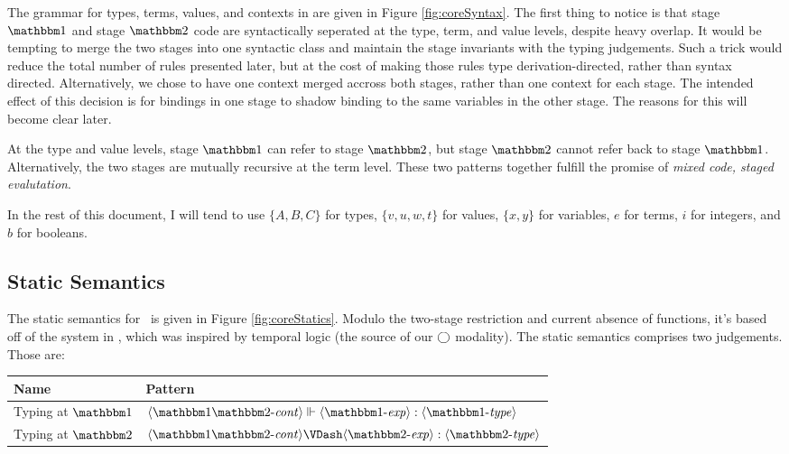 \documentclass{article}
\begin{document}
The grammar for types, terms, values, and contexts in \ellStaged are given in Figure \ref{fig:coreSyntax}.  The first thing to notice is that stage $\bbone$ and stage $\bbtwo$ code are syntactically seperated at the type, term, and value levels, despite heavy overlap.  It would be tempting to merge the two stages into one syntactic class and maintain the stage invariants with the typing judgements.  Such a trick would reduce the total number of rules presented later, but at the cost of making those rules type derivation-directed, rather than syntax directed.  Alternatively, we chose to have one context merged accross both stages, rather than one context for each stage.  The intended effect of this decision is for bindings in one stage to shadow binding to the same variables in the other stage.  The reasons for this will become clear later.

At the type and value levels, stage $\bbone$ can refer to stage $\bbtwo$, but stage $\bbtwo$ cannot refer back to stage $\bbone$.  Alternatively, the two stages are mutually recursive at the term level.  These two patterns together fulfill the promise of {\em mixed code, staged evalutation}.

In the rest of this document, I will tend to use $\{A,B,C\}$ for types, $\{v,u,w,t\}$ for values, $\{x,y\}$ for variables, $e$ for terms, $i$ for integers, and $b$ for booleans.


\subsection{Static Semantics}

The static semantics for \ellStaged~is given in Figure \ref{fig:coreStatics}.  Modulo the two-stage restriction and current absence of functions, it's based off of the system in \cite{davies96}, which was inspired by temporal logic (the source of our $\bigcirc$ modality).  The static semantics comprises two judgements.  Those are:

\begin{center}
\begin{tabular}{|l|l|} \hline
Name & Pattern \\ \hline
Typing at $\bbone$ & $\typesone[\contextot]{\expro}{\typeo}$ \\  \hline
Typing at $\bbtwo$ & $\typestwo[\contextot]{\exprt}{\typet}$ \\ \hline
\end{tabular}
\end{center}
\end{document}
